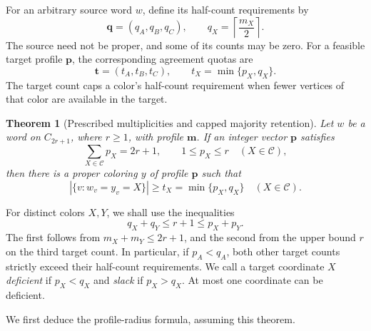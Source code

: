 \documentclass[11pt,reqno]{amsart}
\numberwithin{equation}{section}
\newtheorem{theorem}{Theorem}[section]
\theoremstyle{definition}
\theoremstyle{remark}
\begin{document}
For an arbitrary source word $w$, define its half-count requirements by
\[
\mathbf q=(q_A,q_B,q_C),
\qquad q_X=\left\lceil\frac{m_X}{2}\right\rceil.
\]
The source need not be proper, and some of its counts may be zero.
For a feasible target profile $\mathbf p$, the corresponding agreement
quotas are
\[
\mathbf t=(t_A,t_B,t_C),\qquad t_X=\min\{p_X,q_X\}.
\]
The target count caps a color's half-count requirement when fewer
vertices of that color are available in the target.

\begin{theorem}[Prescribed multiplicities and capped majority retention]
\label{odd:quota}\label{odd:capped}
Let $w$ be a word on $C_{2r+1}$, where $r\ge1$, with profile
$\mathbf m$. If an integer vector $\mathbf p$ satisfies
\begin{equation}\label{odd:target}
\sum_{X\in\mathcal C}p_X=2r+1,
\qquad 1\le p_X\le r
\quad(X\in\mathcal C),
\end{equation}
then there is a proper coloring $y$ of profile $\mathbf p$ such that
\begin{equation}\label{odd:agreements}
|\{v:w_v=y_v=X\}|\ge t_X=\min\{p_X,q_X\}
\quad(X\in\mathcal C).
\end{equation}
\end{theorem}

For distinct colors $X,Y$, we shall use the inequalities
\begin{equation}\label{odd:pair-quota}
q_X+q_Y\le r+1\le p_X+p_Y.
\end{equation}
The first follows from $m_X+m_Y\le2r+1$, and the second from the
upper bound $r$ on the third target count. In particular, if
$p_A<q_A$, both other target counts strictly exceed their half-count
requirements. We call a target coordinate $X$ \emph{deficient} if
$p_X<q_X$ and \emph{slack} if $p_X>q_X$.
At most one coordinate can be deficient.

We first deduce the profile-radius formula, assuming this theorem.
\end{document}
